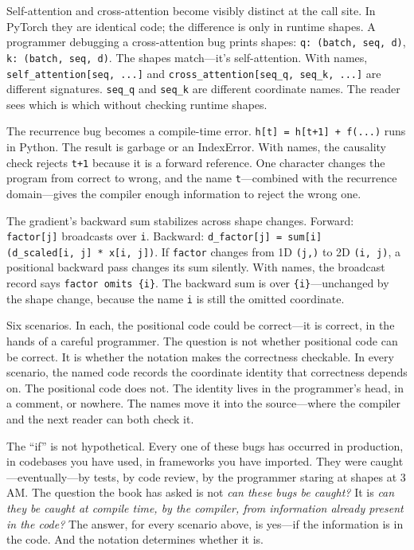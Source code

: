 \documentclass[11pt,titlepage]{article}
\begin{document}
Self-attention and cross-attention become visibly distinct at the call
site. In PyTorch they are identical code; the difference is only in
runtime shapes. A programmer debugging a cross-attention bug prints
shapes: \texttt{q:\ (batch,\ seq,\ d)}, \texttt{k:\ (batch,\ seq,\ d)}.
The shapes match---it's self-attention. With names,
\texttt{self\_attention{[}seq,\ ...{]}} and
\texttt{cross\_attention{[}seq\_q,\ seq\_k,\ ...{]}} are different
signatures. \texttt{seq\_q} and \texttt{seq\_k} are different coordinate
names. The reader sees which is which without checking runtime shapes.

The recurrence bug becomes a compile-time error.
\texttt{h{[}t{]}\ =\ h{[}t+1{]}\ +\ f(...)} runs in Python. The result
is garbage or an IndexError. With names, the causality check rejects
\texttt{t+1} because it is a forward reference. One character changes
the program from correct to wrong, and the name \texttt{t}---combined
with the recurrence domain---gives the compiler enough information to
reject the wrong one.

The gradient's backward sum stabilizes across shape changes. Forward:
\texttt{factor{[}j{]}} broadcasts over \texttt{i}. Backward:
\texttt{d\_factor{[}j{]}\ =\ sum{[}i{]}(d\_scaled{[}i,\ j{]}\ *\ x{[}i,\ j{]})}.
If \texttt{factor} changes from 1D \texttt{(j,)} to 2D \texttt{(i,\ j)},
a positional backward pass changes its sum silently. With names, the
broadcast record says \texttt{factor\ omits\ \{i\}}. The backward sum is
over \texttt{\{i\}}---unchanged by the shape change, because the name
\texttt{i} is still the omitted coordinate.

Six scenarios. In each, the positional code could be correct---it is
correct, in the hands of a careful programmer. The question is not
whether positional code can be correct. It is whether the notation makes
the correctness checkable. In every scenario, the named code records the
coordinate identity that correctness depends on. The positional code
does not. The identity lives in the programmer's head, in a comment, or
nowhere. The names move it into the source---where the compiler and the
next reader can both check it.

The ``if'' is not hypothetical. Every one of these bugs has occurred in
production, in codebases you have used, in frameworks you have imported.
They were caught---eventually---by tests, by code review, by the
programmer staring at shapes at 3 AM. The question the book has asked is
not \emph{can these bugs be caught?} It is \emph{can they be caught at
compile time, by the compiler, from information already present in the
code?} The answer, for every scenario above, is yes---if the information
is in the code. And the notation determines whether it is.
\end{document}
